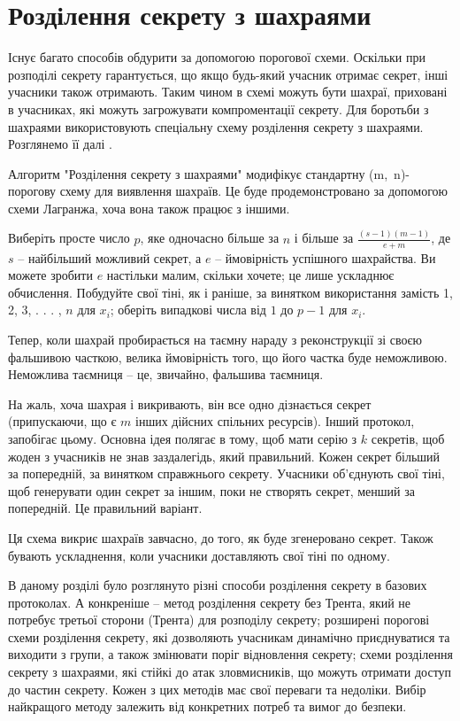 \section{Розділення секрету з шахраями}
Існує багато способів обдурити за допомогою порогової схеми. Оскільки при розподілі секрету гарантується, що якщо будь-який учасник отримає секрет, інші учасники також отримають. Таким чином в схемі можуть бути шахраї, приховані в учасниках, які можуть загрожувати компроментації секрету.
Для боротьби з шахраями використовують спеціальну схему розділення секрету з шахраями. Розглянемо її далі \cite{sssCheaters}.

Алгоритм "Розділення секрету з шахраями" модифікує стандартну (m,~n)-порогову схему для виявлення шахраїв. Це буде продемонстровано за допомогою схеми Лагранжа, хоча вона також працює з іншими.

Виберіть просте число $p$, яке одночасно більше за $n$ і більше за $\frac{(s-1)(m-1)}{e+m}$, де $s$ -- найбільший можливий секрет, а $e$ -- ймовірність успішного шахрайства. Ви можете зробити $e$ настільки малим, скільки хочете; це лише ускладнює обчислення. Побудуйте свої тіні, як і раніше, за винятком використання замість 1, 2, 3, . . . , $n$ для $x_i$; оберіть випадкові числа від $1$ до $p-1$ для $x_i$.

Тепер, коли шахрай пробирається на таємну нараду з реконструкції зі своєю фальшивою часткою, велика ймовірність того, що його частка буде неможливою. Неможлива таємниця -- це, звичайно, фальшива таємниця.

На жаль, хоча шахрая і викривають, він все одно дізнається секрет (припускаючи, що є $m$ інших дійсних спільних ресурсів). Інший протокол, запобігає цьому. Основна ідея полягає в тому, щоб мати серію з $k$ секретів, щоб жоден з учасників не знав заздалегідь, який правильний. Кожен секрет більший за попередній, за винятком справжнього секрету. Учасники об’єднують свої тіні, щоб генерувати один секрет за іншим, поки не створять секрет, менший за попередній. Це правильний варіант.

Ця схема викриє шахраїв завчасно, до того, як буде згенеровано секрет. Також бувають ускладнення, коли учасники доставляють свої тіні по одному.

\chapconclude{\ref{chap:review2}}

В даному розділі було розглянуто різні способи розділення секрету в базових протоколах. А конкреніше -- метод розділення секрету без Трента, який не потребує третьої сторони (Трента) для розподілу секрету; розширені порогові схеми розділення секрету, які дозволяють учасникам динамічно приєднуватися та виходити з групи, а також змінювати поріг відновлення секрету; схеми розділення секрету з шахраями, які стійкі до атак зловмисників, що можуть отримати доступ до частин секрету. Кожен з цих методів має свої переваги та недоліки. Вибір найкращого методу залежить від конкретних потреб та вимог до безпеки.